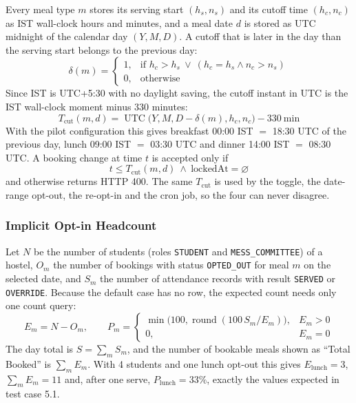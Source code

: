 \documentclass[11pt,a4paper]{article}
\begin{document}
Every meal type $m$ stores its serving start $(h_s, n_s)$ and its cutoff time
$(h_c, n_c)$ as IST wall-clock hours and minutes, and a meal date $d$ is stored
as UTC midnight of the calendar day $(Y, M, D)$. A cutoff that is later in the
day than the serving start belongs to the previous day:
\begin{equation}
\delta(m) =
\begin{cases}
1, & \text{if } h_c > h_s \ \lor\ (h_c = h_s \land n_c > n_s)\\
0, & \text{otherwise}
\end{cases}
\end{equation}
Since IST is UTC+5:30 with no daylight saving, the cutoff instant in UTC is the
IST wall-clock moment minus 330 minutes:
\begin{equation}
T_{\text{cut}}(m, d) = \operatorname{UTC}\bigl(Y, M, D - \delta(m), h_c, n_c\bigr) - 330\ \text{min}
\end{equation}
With the pilot configuration this gives breakfast 00:00 IST $=$ 18:30 UTC of the
previous day, lunch 09:00 IST $=$ 03:30 UTC and dinner 14:00 IST $=$ 08:30 UTC.
A booking change at time $t$ is accepted only if
\begin{equation}
t \leq T_{\text{cut}}(m, d) \ \land\ \text{lockedAt} = \varnothing
\end{equation}
and otherwise returns HTTP 400. The same $T_{\text{cut}}$ is used by the toggle,
the date-range opt-out, the re-opt-in and the cron job, so the four can never
disagree.

\subsubsection{Implicit Opt-in Headcount}

Let $N$ be the number of students (roles \texttt{STUDENT} and
\texttt{MESS\_COMMITTEE}) of a hostel, $O_m$ the number of bookings with status
\texttt{OPTED\_OUT} for meal $m$ on the selected date, and $S_m$ the number of
attendance records with result \texttt{SERVED} or \texttt{OVERRIDE}. Because the
default case has no row, the expected count needs only one count query:
\begin{equation}
E_m = N - O_m, \qquad
P_m =
\begin{cases}
\min\bigl(100, \operatorname{round}(100\, S_m / E_m)\bigr), & E_m > 0\\
0, & E_m = 0
\end{cases}
\end{equation}
The day total is $S = \sum_m S_m$, and the number of bookable meals shown as
``Total Booked'' is $\sum_m E_m$. With 4 students and one lunch opt-out this
gives $E_{\text{lunch}} = 3$, $\sum_m E_m = 11$ and, after one serve,
$P_{\text{lunch}} = 33\%$, exactly the values expected in test case 5.1.
\end{document}
